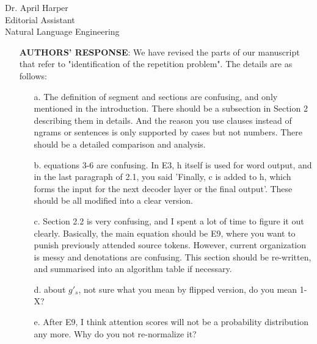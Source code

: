 \documentclass[11pt]{letter} %
\theoremstyle{definition}
\begin{document}
\begin{letter}{Dr. April Harper \\
            Editorial Assistant \\
			Natural Language Engineering}
\begin{enumerate}
\begin{itemize}
\begin{itemize}
			     \item[d.] about $g'_s$, not sure what you mean by flipped version, do you mean 1-X?
			    
			     \item[e.] After E9, I think attention scores will not be a probability distribution any more. Why do you not re-normalize it?
			     \end{itemize}
			    \item[] \textbf{AUTHORS' RESPONSE}:  
			    We have revised the parts of our manuscript that refer to "identification of the repetition problem".
			    The details are as follows:
			    \begin{itemize}
			    \item[a.] The definition of segment and sections are confusing, and only mentioned in the introduction. There should be a subsection in Section 2 describing them in details. And the reason you use clauses instead of ngrams or sentences is only supported by cases but not numbers. There should be a detailed comparison and analysis.
			    
			    \item[b.] equations 3-6 are confusing. In E3, h itself is used for word output, and in the last paragraph of 2.1, you said 'Finally, c is added to h, which forms the input for the next decoder layer or the final output'. These should be all modified into a clear version.
			    
			    \item[c.] Section 2.2 is very confusing, and I spent a lot of time to figure it out clearly. Basically, the main equation should be E9, where you want to punish previously attended source tokens. However, current organization is messy and denotations are confusing. This section should be re-written, and summarised into an algorithm table if necessary.
			    
			    \item[d.] about $g'_s$, not sure what you mean by flipped version, do you mean 1-X?
			    
			    \item[e.] After E9, I think attention scores will not be a probability distribution any more. Why do you not re-normalize it?
			    \end{itemize}
			    				

\end{itemize}
\end{enumerate}
\end{letter}
\end{document}
